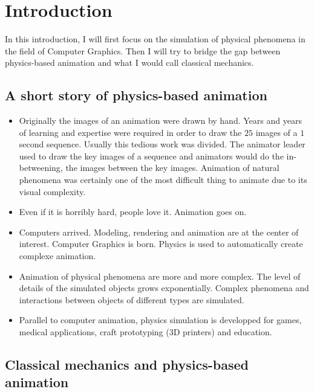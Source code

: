\chapter{Introduction}
\label{chap:introdution}

In this introduction, I will first focus on the simulation of physical phenomena in the field of Computer Graphics. Then I will try to bridge the gap between physics-based animation and what I would call classical mechanics.

\section{A short story of physics-based animation}

\begin{itemize}
\item Originally the images of an animation were drawn by hand. Years and years of learning and expertise were required in order to draw the $25$ images of a $1$ second sequence. Usually this tedious work was divided. The animator leader used to draw the key images of a sequence and animators would  do the in-betweening, the images between the key images. Animation of natural phenomena was certainly one of the most difficult thing to animate due to its visual complexity.
\item Even if it is horribly hard, people love it. Animation goes on.
\item Computers arrived. Modeling, rendering and animation are at the center of interest. Computer Graphics is born. Physics is used to automatically create complexe animation.
\item Animation of physical phenomena are more and more complex. The level of details of the simulated objects grows exponentially. Complex phenomena and interactions between objects of different types are simulated.
\item Parallel to computer animation, physics simulation is developped for games, medical applications, craft prototyping (3D printers) and education.
\end{itemize}

\section{Classical mechanics and physics-based animation}

